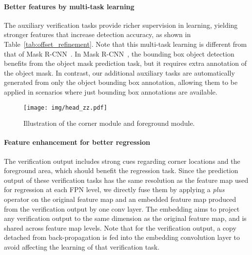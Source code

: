 \documentclass{article}
\begin{document}
\paragraph{Better features by multi-task learning} The auxiliary verification tasks provide richer supervision in learning, yielding stronger features that increase detection accuracy, as shown in Table~\ref{tab:offset_refinement}. Note that this multi-task learning is different from that of Mask R-CNN~\cite{Mask-rcnn}. In Mask R-CNN~\cite{Mask-rcnn}, the bounding box object detection benefits from the object mask prediction task, but it requires extra annotation of the object mask. In contrast, our additional auxiliary tasks are automatically generated from only the object bounding box annotation, allowing them to be applied in scenarios where just bounding box annotations are available.

\begin{wrapfigure}{r}{0.45\textwidth}
  \begin{center}
    \texttt{[image: img/head\_zz.pdf]}
  \end{center}
  \vspace{-1.5em}
  \caption{Illustration of the corner module and foreground module. }
  \label{fig:head}
  \vspace{-1em}
\end{wrapfigure}

\paragraph{Feature enhancement for better regression} The verification output includes strong cues regarding corner locations and the foreground area, which should benefit the regression task. Since the prediction output of these verification tasks has the same resolution as the feature map used for regression at each FPN level, we directly fuse them by applying a \emph{plus} operator on the original feature map and an embedded feature map produced from the verification output by one  conv layer. The embedding aims to project any verification output to the same dimension as the original feature map, and is shared across feature map levels. Note that for the verification output, a copy detached from back-propagation is fed into the embedding convolution layer to avoid affecting the learning of that verification task.
\end{document}
